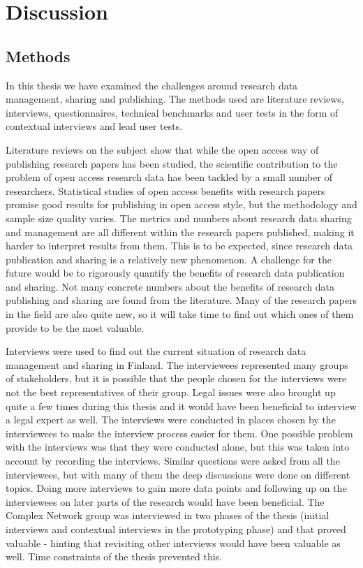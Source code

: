 \chapter{Discussion}
\label{chapter:discussion}

\section{Methods}

In this thesis we have examined the challenges around research data management,
sharing and publishing. The methods used are literature reviews,
interviews, questionnaires, technical benchmarks and user tests in the form of contextual
interviews and lead user tests.

Literature reviews on the subject show that while the open access way of
publishing research papers has been studied, the scientific contribution to
the problem of open access research data has been tackled by a small number
of researchers. Statistical studies of open access benefits with research
papers promise good results for publishing in open access style, but the
methodology and sample size quality varies. The metrics and numbers about
research data sharing and management are all different within the research
papers published, making it harder to interpret results from them. This is to
be expected, since research data publication and sharing is a relatively new
phenomenon. A challenge for the future would be to rigorously quantify the
benefits of research data publication and sharing. Not many concrete numbers
about the benefits of research data publishing and sharing are found from the
literature. Many of the research papers
in the field are also quite new, so it will take time to find out which ones
of them provide to be the most valuable.

Interviews were used to find out the current situation of research data
management and sharing in Finland. The interviewees represented many groups
of stakeholders, but it is possible that the people chosen for the interviews
were not the best representatives of their group. Legal issues were also
brought up quite a few times during this thesis and it would have been
beneficial to interview a legal expert as well. The interviews were conducted
in places chosen by the interviewees to make the interview process easier
for them. One possible problem with the interviews was that they were
conducted alone, but this was taken into account by recording the interviews.
Similar questions were asked from all the interviewees, but with many of them
the deep discussions were done on different topics. Doing more interviews to
gain more data points and following up on the interviewees on later parts
of the research would have been beneficial. The Complex Network group was
interviewed in two phases of the thesis (initial interviews and contextual
interviews in the prototyping phase) and that proved valuable - hinting
that revisiting other interviews would have been valuable as well. Time
constraints of the thesis prevented this.

